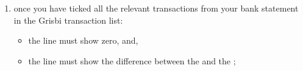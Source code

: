 \begin{enumerate}
\begin{itemize}
		\item press the key combination ,
		\item press the space bar (which also moves the selection to the line below);
	\end{itemize}	 
	A \enquote{P} will then appear to indicate that the transaction has been \enquote{pointed}; if you have made a mistake, another click, another  or another press of the space bar (preceded by moving the selection to the line above) removes the \enquote{P}; with each new \enquote{P}, in the  column, the  line in the reconciliation area is increased by the same amount, positively if it is a credit and negatively if it is a debit, and the  line does the same;
	\item once you have ticked all the relevant transactions from your bank statement in the Grisbi transaction list:
	\begin{itemize}
		\item the line  must show zero, and,
		\item the line  must show the difference between the  and the ;

\end{itemize}
\end{enumerate}
